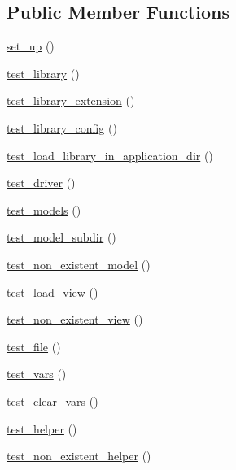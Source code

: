 \subsection*{Public Member Functions}
\begin{DoxyCompactItemize}
\item 
\hyperlink{class_loader__test_a69829875c8d4b6ce94908445c4155741}{set\+\_\+up} ()
\item 
\hyperlink{class_loader__test_aa03c12d857da32ac77076032c3ab9cad}{test\+\_\+library} ()
\item 
\hyperlink{class_loader__test_ab7ecc36ffbaa16a093024a99f950778c}{test\+\_\+library\+\_\+extension} ()
\item 
\hyperlink{class_loader__test_ae85fde36b6bf0a01017d0484ea733d9c}{test\+\_\+library\+\_\+config} ()
\item 
\hyperlink{class_loader__test_abe70f038a1a01a953e7b5fce403b3b05}{test\+\_\+load\+\_\+library\+\_\+in\+\_\+application\+\_\+dir} ()
\item 
\hyperlink{class_loader__test_a790c541b50b7863d552fadaf7f0f6e0c}{test\+\_\+driver} ()
\item 
\hyperlink{class_loader__test_a77359b939e12f918da86ef940cb58a2e}{test\+\_\+models} ()
\item 
\hyperlink{class_loader__test_a95e7e4df1e608354c5f9a56531ec9076}{test\+\_\+model\+\_\+subdir} ()
\item 
\hyperlink{class_loader__test_a0c5127b93fd432066f40c085c70d04c2}{test\+\_\+non\+\_\+existent\+\_\+model} ()
\item 
\hyperlink{class_loader__test_a623527cd52bea3a9f015a7a92e83229c}{test\+\_\+load\+\_\+view} ()
\item 
\hyperlink{class_loader__test_a2e58671c47e058527438e8dc0da46b86}{test\+\_\+non\+\_\+existent\+\_\+view} ()
\item 
\hyperlink{class_loader__test_a8fd67fe46639e1c6482d76dad5deb433}{test\+\_\+file} ()
\item 
\hyperlink{class_loader__test_a6f5ea9aad66d452fc4842558ebb2d10e}{test\+\_\+vars} ()
\item 
\hyperlink{class_loader__test_ad1d872971a66aa16cae4d4b8e6517f2f}{test\+\_\+clear\+\_\+vars} ()
\item 
\hyperlink{class_loader__test_ad1e4b3dd5f0c97d85e6cfc26ee0387bc}{test\+\_\+helper} ()
\item 
\hyperlink{class_loader__test_a77d8d23ee6b3ae186baf741ee51e0f71}{test\+\_\+non\+\_\+existent\+\_\+helper} ()
\item 

\end{DoxyCompactItemize}
